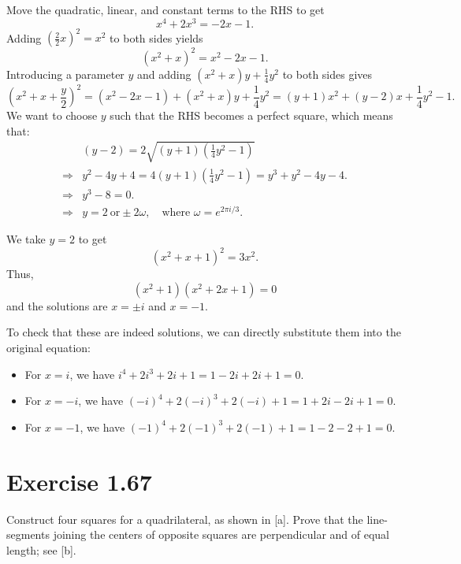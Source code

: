 \documentclass{article}
\begin{document}
\begin{solution}
  Move the quadratic, linear, and constant terms to the RHS to get
  \[
    x^4 + 2x^3 = -2x - 1.
  \]
  Adding $(\frac{2}{2}x)^2 = x^2$ to both sides yields
  \[
    (x^2 + x)^2 = x^2 - 2x - 1.
  \]
  Introducing a parameter $y$ and adding $(x^2 + x)y +
  \frac{1}{4}y^2$ to both sides gives
  \[
    (x^2 + x + \frac{y}{2})^2 = (x^2 - 2x - 1) + (x^2 + x)y + \frac{1}{4}y^2
    = (y+1) x^2 + (y - 2)x + \frac{1}{4}y^2 - 1.
  \]
  We want to choose $y$ such that the RHS becomes a perfect square,
  which means that:
  \[
    \begin{aligned}
      &(y-2) = 2 \sqrt{(y+1)(\frac{1}{4}y^2-1)} \\
      \Rightarrow& y^2 - 4y + 4 = 4(y+1)(\frac{1}{4}y^2-1) = y^3+y^2-4y-4. \\
      \Rightarrow& y^3 - 8 = 0. \\
      \Rightarrow& y = 2 \ \text{or} \pm 2\omega, \quad \text{where }
      \omega = e^{2\pi i/3}.
    \end{aligned}
  \]

  We take $y = 2$ to get
  \[
    (x^2 + x + 1)^2 = 3x^2.
  \]
  Thus, \[
    (x^2 + 1)(x^2 + 2x + 1) = 0
  \]
  and the solutions are $x = \pm i$ and $x = -1$.

  To check that these are indeed solutions, we can directly substitute them
  into the original equation:
  \begin{itemize}
    \item For $x = i$, we have $i^4 + 2i^3 + 2i + 1 = 1 - 2i + 2i + 1 = 0$.
    \item For $x = -i$, we have $(-i)^4 + 2(-i)^3 + 2(-i) + 1 = 1 +
      2i - 2i + 1 = 0$.
    \item For $x = -1$, we have $(-1)^4 + 2(-1)^3 + 2(-1) + 1 = 1 - 2
      - 2 + 1 = 0$.
  \end{itemize}

\end{solution}

\section{Exercise 1.67}
Construct four squares for a quadrilateral, as shown in [a]. Prove
that the line-segments joining the centers of opposite squares are
perpendicular and of equal length; see [b].
\end{document}
